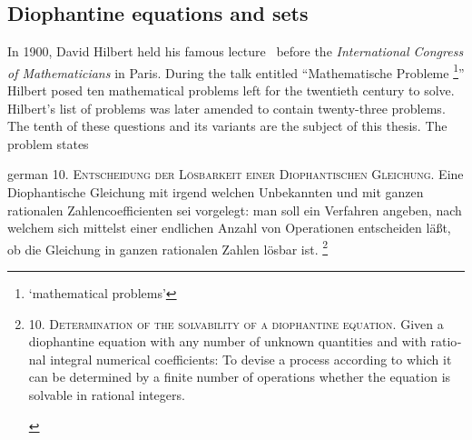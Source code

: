 %

\subsection{Diophantine equations and sets}

In 1900, David Hilbert held his famous lecture~\cite{Hilbert1900} before the
\emph{International Congress of Mathematicians} in Paris. During the talk
entitled \foreignquote{german}{Mathematische Probleme%
\footnote{%
  \foreignquote{english}{mathematical problems}
}}
Hilbert posed ten mathematical problems left for the twentieth century to solve.
Hilbert's list of problems was later amended to contain twenty-three problems.
The tenth of these questions and its variants are the subject of this thesis.
The problem states

\begin{foreigndisplayquote}{german}
  \textsc{10. Entscheidung der Lösbarkeit einer Diophantischen Gleichung.}
  Eine Diophantische Gleichung mit irgend welchen Unbekannten und mit
  ganzen rationalen Zahlencoefficienten sei vorgelegt: man soll ein Verfahren
  angeben, nach welchem sich mittelst einer endlichen Anzahl von Operationen
  entscheiden läßt, ob die Gleichung in ganzen rationalen Zahlen lösbar ist.%
  \footnote{
    \begin{english}
      \textsc{10. Determination of the solvability of a diophantine equation.}
      Given a diophantine equation with any number of unknown quantities and
      with rational integral numerical coefficients: To devise a process
      according to which it can be determined by a finite number of operations
      whether the equation is solvable in rational integers.
      \hspace*{\fill}\cite[translation published in][]{Hilbert2000}
    \end{english}
  }
  \hspace*{\fill}\cite{Hilbert1900}
\end{foreigndisplayquote}


